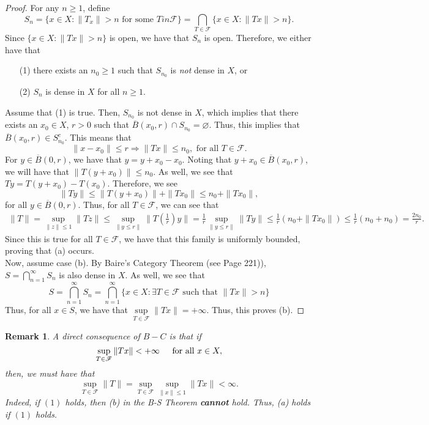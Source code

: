 \documentclass[12pt]{article}
\newtheorem{remark}{Remark}
\newcommand{\F}{{\mathscr F}}
\begin{document}
 \begin{proof}
 For any $n \geq 1$, define 
 \[ S_n = \{ x \in X : \| T_x \| > n \text{ for some } T in \F \} = \bigcap\limits_{T \in \F} \{ x \in X : \| Tx \| > n\}.\]
 Since $\{ x \in X : \| Tx \| > n\}$ is open, we have that $S_n$ is open. Therefore, we either have that 
 \begin{enumerate}[topsep=-15pt, itemsep=0pt]
\item[(1)] there exists an $n_0 \geq 1$ such that $S_{n_0}$ is \textit{not} dense in $X$, or 
\item[(2)] $S_n$ is dense in $X$ for all $n \geq 1$. 
 \end{enumerate}
 Assume that (1) is true. Then, $S_{n_0}$ is not dense in $X$, which implies that there exists an $x_0 \in X$, $r > 0$ such that $\overline{B}(x_0, r) \cap S_{n_0} = \varnothing$. Thus, this implies that $\overline{B}(x_0, r) \in S_{n_0}^c$. This means that 
 \begin{equation}
 \| x - x_0 \| \leq r \Longrightarrow \| Tx \| \leq n_0, \text{ for all } T \in \F. 
 \end{equation}
 For $y \in \overline{B}(0, r)$, we have that $y = y + x_0 - x_0$. Noting that $y + x_0 \in \overline{B}(x_0, r)$, we will have that 
 $\| T(y + x_0 ) \| \leq n_0$. As well, we see that $Ty = T(y + x_0) - T(x_0)$. Therefore, we see 
 \[ \| Ty \| \leq \| T(y + x_0) \| + \| Tx_0\| \leq n_0 + \| T x_0 \|,\]
 for all $y \in \overline{B}(0, r)$. Thus, for all $T \in \F$, we can see that 
 \begin{align*}
 \| T \| = \sup\limits_{\| z \| \leq 1} \| Tz \| \leq \sup\limits_{\| y \leq r \|} \| T(\frac{1}{r}) y \| = \frac{1}{r} \sup\limits_{\| y \leq r \|} \| T y \| \leq \frac{1}{r} (n_0 + \| T x_0 \|) \leq \frac{1}{r} (n_0 + n_0) = \frac{2 n_0}{r}.
 \end{align*}
 Since this is true for all $T \in \F$, we have that this family is uniformly bounded, proving that (a) occurs.\\ 
 \indent Now, assume case (b). By Baire's Category Theorem (see Page 221)), $S = \bigcap\limits_{n =1}^{\infty} S_n$ is also dense in $X$. As well, we see that 
 \[S = \bigcap\limits_{n =1}^{\infty} S_n = \bigcap\limits_{n =1}^{\infty} \{ x \in X : \exists T \in \F \text{ such that } \| Tx \| > n \} \]
 Thus, for all $x \in S$, we have that $\sup\limits_{T \in \F} \| Tx \| =  + \infty$. Thus, this proves (b). 
 \end{proof}
 \begin{remark}
 A direct consequence of $B -C$ is that if 
 \begin{equation}
 \sup\limits_{T \in \F} \| Tx \| < + \infty \hspace{4mm} \text{ for all } x \in X,
 \end{equation}
 then, we must have that 
 \begin{equation}
  \sup\limits_{T \in \F} \| T \|=  \sup\limits_{T \in \F} \sup\limits_{\| x \| \leq 1} \| Tx \| < \infty.
 \end{equation}
 Indeed, if $(1)$ holds, then (b) in the B-S Theorem \textbf{cannot} hold. Thus, (a) holds if $(1)$ holds.
 \end{remark}
\end{document}
